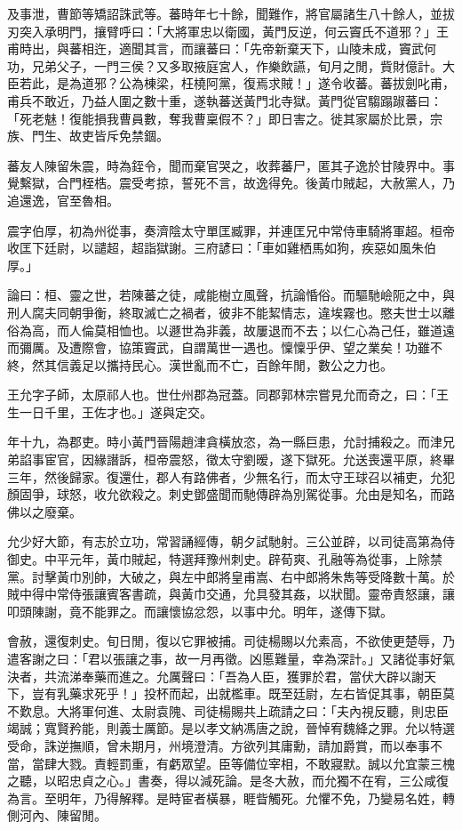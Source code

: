 \begin{pinyinscope}
及事泄，曹節等矯詔誅武等。蕃時年七十餘，聞難作，將官屬諸生八十餘人，並拔刃突入承明門，攘臂呼曰：「大將軍忠以衛國，黃門反逆，何云竇氏不道邪？」王甫時出，與蕃相迕，適聞其言，而讓蕃曰：「先帝新棄天下，山陵未成，竇武何功，兄弟父子，一門三侯？又多取掖庭宮人，作樂飲讌，旬月之閒，貲財億計。大臣若此，是為道邪？公為棟梁，枉橈阿黨，復焉求賊！」遂令收蕃。蕃拔劍叱甫，甫兵不敢近，乃益人圍之數十重，遂執蕃送黃門北寺獄。黃門從官騶蹋踧蕃曰：「死老魅！復能損我曹員數，奪我曹稟假不？」即日害之。徙其家屬於比景，宗族、門生、故吏皆斥免禁錮。

蕃友人陳留朱震，時為銍令，聞而棄官哭之，收葬蕃尸，匿其子逸於甘陵界中。事覺繫獄，合門桎梏。震受考掠，誓死不言，故逸得免。後黃巾賊起，大赦黨人，乃追還逸，官至魯相。

震字伯厚，初為州從事，奏濟陰太守單匡臧罪，并連匡兄中常侍車騎將軍超。桓帝收匡下廷尉，以譴超，超詣獄謝。三府諺曰：「車如雞栖馬如狗，疾惡如風朱伯厚。」

論曰：桓、靈之世，若陳蕃之徒，咸能樹立風聲，抗論惛俗。而驅馳嶮阨之中，與刑人腐夫同朝爭衡，終取滅亡之禍者，彼非不能絜情志，違埃霧也。愍夫世士以離俗為高，而人倫莫相恤也。以遯世為非義，故屢退而不去；以仁心為己任，雖道遠而彌厲。及遭際會，協策竇武，自謂萬世一遇也。懍懍乎伊、望之業矣！功雖不終，然其信義足以攜持民心。漢世亂而不亡，百餘年閒，數公之力也。

王允字子師，太原祁人也。世仕州郡為冠蓋。同郡郭林宗嘗見允而奇之，曰：「王生一日千里，王佐才也。」遂與定交。

年十九，為郡吏。時小黃門晉陽趙津貪橫放恣，為一縣巨患，允討捕殺之。而津兄弟諂事宦官，因緣譖訴，桓帝震怒，徵太守劉暧，遂下獄死。允送喪還平原，終畢三年，然後歸家。復還仕，郡人有路佛者，少無名行，而太守王球召以補吏，允犯顏固爭，球怒，收允欲殺之。刺史鄧盛聞而馳傳辟為別駕從事。允由是知名，而路佛以之廢棄。

允少好大節，有志於立功，常習誦經傳，朝夕試馳射。三公並辟，以司徒高第為侍御史。中平元年，黃巾賊起，特選拜豫州刺史。辟荀爽、孔融等為從事，上除禁黨。討擊黃巾別帥，大破之，與左中郎將皇甫嵩、右中郎將朱雋等受降數十萬。於賊中得中常侍張讓賓客書疏，與黃巾交通，允具發其姦，以狀聞。靈帝責怒讓，讓叩頭陳謝，竟不能罪之。而讓懷協忿怨，以事中允。明年，遂傳下獄。

會赦，還復刺史。旬日閒，復以它罪被捕。司徒楊賜以允素高，不欲使更楚辱，乃遣客謝之曰：「君以張讓之事，故一月再徵。凶慝難量，幸為深計。」又諸從事好氣決者，共流涕奉藥而進之。允厲聲曰：「吾為人臣，獲罪於君，當伏大辟以謝天下，豈有乳藥求死乎！」投杯而起，出就檻車。既至廷尉，左右皆促其事，朝臣莫不歎息。大將軍何進、太尉袁隗、司徒楊賜共上疏請之曰：「夫內視反聽，則忠臣竭誠；寬賢矜能，則義士厲節。是以孝文納馮唐之說，晉悼宥魏絳之罪。允以特選受命，誅逆撫順，曾未期月，州境澄清。方欲列其庸勳，請加爵賞，而以奉事不當，當肆大戮。責輕罰重，有虧眾望。臣等備位宰相，不敢寢默。誠以允宜蒙三槐之聽，以昭忠貞之心。」書奏，得以減死論。是冬大赦，而允獨不在宥，三公咸復為言。至明年，乃得解釋。是時宦者橫暴，睚眥觸死。允懼不免，乃變易名姓，轉側河內、陳留閒。


\end{pinyinscope}
